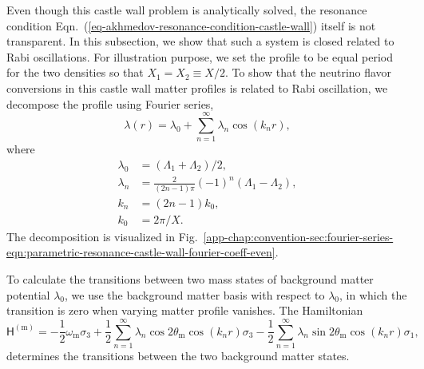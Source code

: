Even though this castle wall problem is analytically solved, the resonance condition Eqn.~(\ref{eq-akhmedov-resonance-condition-castle-wall}) itself is not transparent. In this subsection, we show that such a system is closed related to Rabi oscillations. For illustration purpose, we set the profile to be equal period for the two densities so that $X_1=X_2\equiv X/2$. To show that the neutrino flavor conversions in this castle wall matter profiles is related to Rabi oscillation, we decompose the profile using Fourier series,
\begin{equation}
\lambda(r) = \lambda_0 + \sum_{n=1}^{\infty} \lambda_n \cos\left( k_n  r \right),
\label{eq-castle-wall-fourier-expanded}
\end{equation}
where
\begin{align*}
\lambda_0 &= (\Lambda_1 + \Lambda_2)/2, \\
\lambda_n & = \frac{2}{(2n-1)\pi}  (-1)^n  \left( \Lambda_1 -  \Lambda_2 \right),\\
k_n &= (2n-1)k_0, \\
k_0 &= 2\pi/X.
\end{align*}
The decomposition is visualized in Fig.~\ref{app-chap:convention-sec:fourier-series-eqn:parametric-resonance-castle-wall-fourier-coeff-even}.

To calculate the transitions between two mass states of background matter potential $\lambda_0$, we use the background matter basis with respect to $\lambda_0$, in which the transition is zero when varying matter profile vanishes. The Hamiltonian
\begin{equation}
\mathsf H^{(\mathrm m)} = - \frac{1}{2}\omega_{\mathrm m} \sigma_3  + \frac{1}{2} \sum_{n=1}^{\infty} \lambda_n \cos 2\theta_{\mathrm m} \cos\left( k_n  r \right)  \sigma_3 - \frac{1}{2} \sum_{n=1}^{\infty} \lambda_n \sin 2\theta_{\mathrm m}  \cos\left( k_n r \right) \sigma_1,
\label{castle-wall-decomposed-hamiltonian}
\end{equation}
determines the transitions between the two background matter states.


